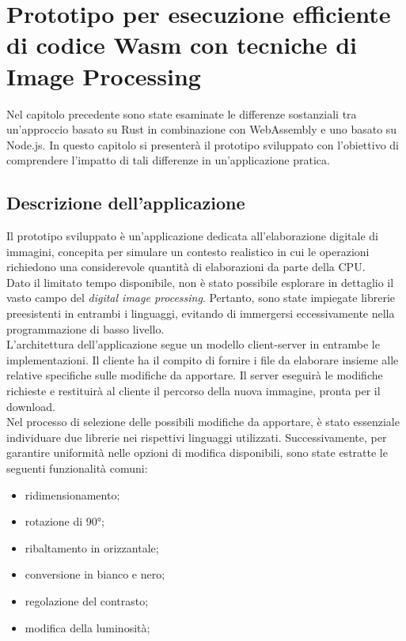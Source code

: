 \chapter{Prototipo per esecuzione efficiente di codice Wasm con tecniche di Image Processing}
\label{chap:3}
Nel capitolo precedente sono state esaminate le differenze sostanziali tra un'approccio basato su Rust in combinazione con WebAssembly e uno basato su Node.js.
In questo capitolo si presenterà il prototipo sviluppato con l'obiettivo di comprendere l'impatto di tali differenze in un'applicazione pratica.
\section{Descrizione dell'applicazione}
Il prototipo sviluppato è un'applicazione dedicata all'elaborazione digitale di immagini, concepita per simulare un contesto realistico in cui le operazioni richiedono una considerevole quantità di elaborazioni da parte della CPU.
\\Dato il limitato tempo disponibile, non è stato possibile esplorare in dettaglio il vasto campo del \emph{digital image processing}. Pertanto, sono state impiegate librerie preesistenti in entrambi i linguaggi, evitando di immergersi eccessivamente nella programmazione di basso livello.
\\L'architettura dell'applicazione segue un modello client-server in entrambe le implementazioni.
Il cliente ha il compito di fornire i file da elaborare insieme alle relative specifiche sulle modifiche da apportare.
Il server eseguirà le modifiche richieste e restituirà al cliente il percorso della nuova immagine, pronta per il download.
\\Nel processo di selezione delle possibili modifiche da apportare, è stato essenziale individuare due librerie nei rispettivi linguaggi utilizzati.
Successivamente, per garantire uniformità nelle opzioni di modifica disponibili, sono state estratte le seguenti funzionalità comuni: 
\begin{itemize}
    \item ridimensionamento;
    \item rotazione di 90°;
    \item ribaltamento in orizzantale;
    \item conversione in bianco e nero;
    \item regolazione del contrasto;
    \item modifica della luminosità;
\end{itemize}
